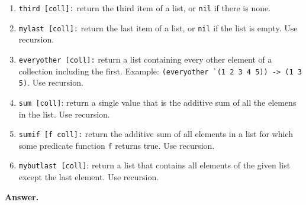 \documentclass[9pt]{article}
\begin{document}
\begin{enumerate}
         \begin{enumerate}
            \item \verb|third [coll]:| return the third item of a list, or
                  \verb|nil| if there is none.
            \item \verb|mylast [coll]:| return the last item of a list, or
                  \verb|nil| if the list is empty. Use recursion.
            \item \verb|everyother [coll]:| return a list containing every other
                  element of a collection including the first. Example:
                  \verb|(everyother `(1 2 3 4 5)) -> (1 3 5)|. Use recursion.
            \item \verb|sum [coll]|: return a single value that is the additive
                  sum of all the elemens in the list. Use recursion.
            \item \verb|sumif [f coll]:| return the additive sum of all elements
                  in a list for which some predicate function \verb|f| returns
                  true. Use recursion.
            \item \verb|mybutlast [coll]|: return a list that contains all
                  elements of the given list except the last element. Use
                  recursion.
         \end{enumerate}

      \textbf{Answer.}
      

\end{enumerate}
\end{document}
